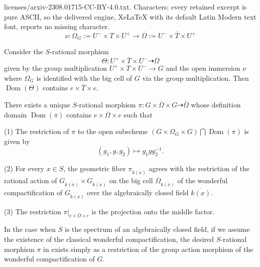 \documentclass[10pt,a4paper]{amsart}
\DeclareMathOperator{\Dom}{Dom} %
\begin{document}
licenses/arxiv-2308.01715-CC-BY-4.0.txt. Characters: every retained excerpt is pure ASCII, so the delivered engine, XeLaTeX with its default Latin Modern text font, reports no missing character.
\begin{equation}\label{Omegaembedformula}
    \nu\colon\Omega_G:=U^-\times T\times U^+\longrightarrow \overline{\Omega}:=U^-\times \overline{T}\times U^+
\end{equation}

\begin{lemma}\label{extensionofmultiplication}
    Consider the $S$-rational morphism 
    $$\Theta: U^+\times \overline{T}\times U^-\dashrightarrow \overline{\Omega}$$
    given by the group multiplication $U^+\times T\times U^-\longrightarrow G$ and the open immersion $\nu$  where $\Omega_G$ is identified with the big cell of $G$ via the group multiplication. Then $\Dom(\Theta)$ contains $e\times \overline{T}\times e$.
\end{lemma}

\begin{theorem}\label{theoremrationalaction}
    There exists a unique $S$-rational morphism $\pi\colon G\times\overline{\Omega}\times G\dashrightarrow \overline{\Omega}$ whose definition domain $\Dom(\pi)$ contains $e\times\overline{\Omega}\times e$ 
    such that 

    (1) The restriction of $\pi$ to the open subscheme $(G\times\Omega_G\times G)\bigcap\Dom(\pi)$ is given by 
$$(g_1,g,g_2)\longmapsto g_1gg_2^{-1}.$$
        
    (2) For every $x\in S$, the geometric fiber $\pi_{\overline{k(x)}}$ agrees with the restriction of the rational action of $G_{\overline{k(x)}}\times G_{\overline{k(x)}}$ on the big cell $\overline{\Omega}_{\overline{k(x)}}$ of the wonderful compactification of $G_{\overline{k(x)}}$ over the algebraically closed field $\overline{k(x)}$.

    (3) The restriction $\pi\vert_{e\times\overline{\Omega}\times e}$ is the projection onto the middle factor. 
\end{theorem}

\begin{remark}
    In the case when $S$ is the spectrum of an algebraically closed field, if we assume the existence of the classical wonderful compactification, the desired $S$-rational morphism $\pi$ in  exists simply as a restriction of the group action morphism of the wonderful compactification of $G$.  
\end{remark}
\end{document}
